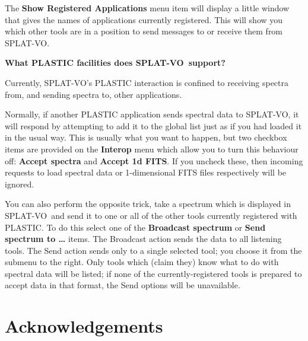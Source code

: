 \documentclass[twoside,11pt]{article}
\renewcommand{\_}{\texttt{\symbol{95}}}
\newcommand{\SPLAT}{\textsf{SPLAT-VO}}
\newcommand{\menuitem}[1]{\textbf{#1}}
\newcommand{\subheading}[1]{\textbf{\large{#1}}}
\begin{document}
The \menuitem{Show Registered Applications} menu item will display a
little window that gives the names of applications currently registered.
This will show you which other tools are in a position to send messages
to or receive them from \SPLAT.

\subheading{What PLASTIC facilities does \SPLAT\ support?}

Currently, \SPLAT's PLASTIC interaction is confined to receiving
spectra from, and sending spectra to, other applications.

Normally, if another PLASTIC application sends spectral data to \SPLAT,
it will respond by attempting to add it to the global list
just as if you had loaded it in the usual way.
This is usually what you want to happen, but two checkbox items
are provided on the \menuitem{Interop} menu which allow you to turn this 
behaviour off: \menuitem{Accept spectra} and \menuitem{Accept 1d FITS}.
If you uncheck these, then incoming requests to load
spectral data or 1-dimensional FITS files respectively will be ignored.

You can also perform the opposite trick, take a spectrum which is
displayed in \SPLAT\ and send it to one or all of the other tools
currently registered with PLASTIC.  To do this select one of the
\menuitem{Broadcast spectrum} or \menuitem{Send spectrum to \ldots} items.  
The Broadcast action sends the data to all listening tools.
The Send action sends only to a single selected tool; you choose it
from the submenu to the right.  Only tools which (claim they) know 
what to do with spectral data will be listed; if none of the 
currently-registered tools is prepared to accept data in that format, 
the Send options will be unavailable.

\section{Acknowledgements}
\end{document}
